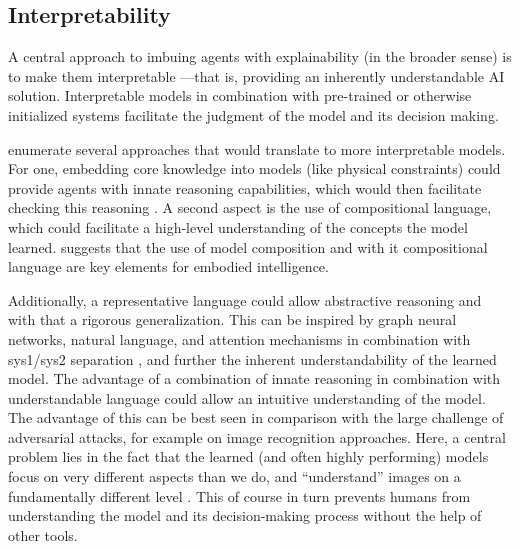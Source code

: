 \documentclass[twoside,11pt]{article}
\begin{document}
\begin{enumerate}
\subsection{Interpretability}
\label{subsec:interpretability}
A central approach to imbuing agents with explainability (in the broader sense) is to make them interpretable ---that is, providing an inherently understandable AI solution. Interpretable models in combination with pre-trained or otherwise initialized systems facilitate the judgment of the model and its decision making.

\citet{RoyEtAl:2021:RLRoboticsChallenges} enumerate several approaches that would translate to more interpretable models. For one, embedding core knowledge into models (like physical constraints) could provide agents with innate reasoning capabilities, which would then facilitate checking this reasoning \citep{HaSchmidhuber:2018:CoreKnowledgeWorldModels}. A second aspect is the use of compositional language, which could facilitate a high-level understanding of the concepts the model learned. \citet{Koditschek:2021:RoboticsCompositionalLanguage} suggests that the use of model composition and with it compositional language are key elements for embodied intelligence.

Additionally, a representative language could allow abstractive reasoning and with that a rigorous generalization. This can be inspired by graph neural networks, natural language, and attention mechanisms in combination with sys1/sys2 separation \citep{RoyEtAl:2021:RLRoboticsChallenges}, and further the inherent understandability of the learned model.
The advantage of a combination of innate reasoning in combination with understandable language could allow an intuitive understanding of the model. The advantage of this can be best seen in comparison with the large challenge of adversarial attacks, for example on image recognition approaches. Here, a central problem lies in the fact that the learned (and often highly performing) models focus on very different aspects than we do, and ``understand'' images on a fundamentally different level \citep{ChakrabortyEtAl:2021:SurveyAdversarialAttacks}. This of course in turn prevents humans from understanding the model and its decision-making process without the help of other tools.


\end{enumerate}
\end{document}
